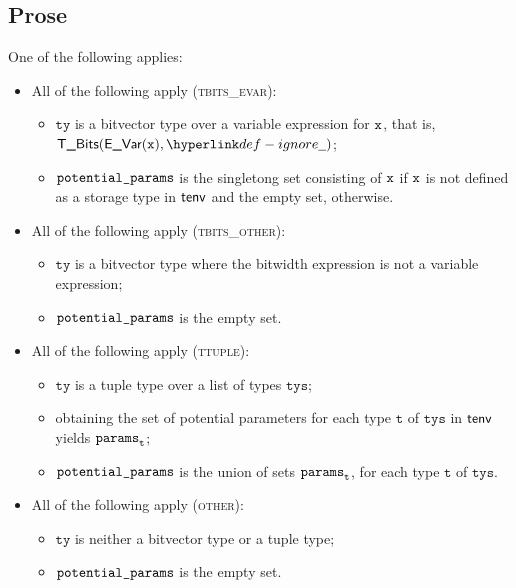 \documentclass{book}
\newcommand\vt[0]{\texttt{t}}
\newcommand\tty[0]{\texttt{ty}}
\newcommand\tys[0]{\texttt{tys}}
\begin{document}
\subsection{Prose}
One of the following applies:
\begin{itemize}
  \item All of the following apply (\textsc{tbits\_evar}):
  \begin{itemize}
    \item $\tty$ is a bitvector type over a variable expression for $\texttt{x}$, that is, \\ $\TBits(\EVar(\vx), \Ignore)$;
    \item $\texttt{potential\_params}$ is the singletong set consisting of $\texttt{x}$ if $\texttt{x}$ is not defined as a storage type in $\textsf{tenv}$
          and the empty set, otherwise.
  \end{itemize}

  \item All of the following apply (\textsc{tbits\_other}):
  \begin{itemize}
    \item $\tty$ is a bitvector type where the bitwidth expression is not a variable expression;
    \item $\texttt{potential\_params}$ is the empty set.
  \end{itemize}

  \item All of the following apply (\textsc{ttuple}):
  \begin{itemize}
    \item $\tty$ is a tuple type over a list of types $\tys$;
    \item obtaining the set of potential parameters for each type $\vt$ of $\tys$ in $\textsf{tenv}$ yields $\vparams_\vt$;
    \item $\texttt{potential\_params}$ is the union of sets $\vparams_\vt$, for each type $\vt$ of $\tys$.
  \end{itemize}

  \item All of the following apply (\textsc{other}):
  \begin{itemize}
    \item $\tty$ is neither a bitvector type or a tuple type;
    \item $\texttt{potential\_params}$ is the empty set.
  \end{itemize}
\end{itemize}
\end{document}

